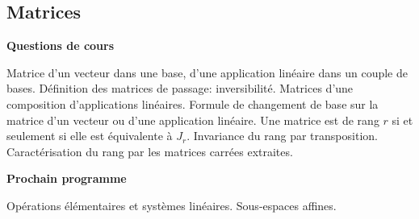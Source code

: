 






\subsection{Matrices}



\bigskip
\begin{center}
 \textbf{Questions de cours}
\end{center}
Matrice d'un vecteur dans une base, d'une application linéaire dans un couple de bases.\newline
Définition des matrices de passage: inversibilité.\newline
Matrices d'une composition d'applications linéaires.\newline
Formule de changement de base sur la matrice d'un vecteur ou d'une application linéaire.\newline
Une matrice est de rang $r$ si et seulement si elle est équivalente à $J_r$.\newline
Invariance du rang par transposition.\newline
Caractérisation du rang par les matrices carrées extraites.

\bigskip
\begin{center}
 \textbf{Prochain programme}
\end{center}
Opérations élémentaires et systèmes linéaires. Sous-espaces affines.

